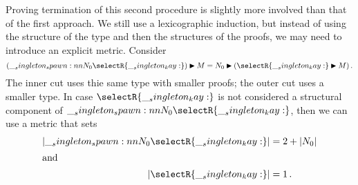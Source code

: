 Proving termination of this second procedure is slightly more involved than that of the first approach.
We still use a lexicographic induction, but instead of using the structure of the type and then the structures of the proofs, we may need to introduce an explicit metric.
Consider
\begin{equation*}
  \nspawn{(\spawn{N_0}{\selectR{\kay}})}{M}
    = \nspawn{N_0}{(\nspawn{\selectR{\kay}}{M})} \,.
\end{equation*}
The inner cut uses thie same type with smaller proofs; the outer cut uses a smaller type.
In case $\selectR{\kay}$ is not considered a structural component of $\spawn{N_0}{\selectR{\kay}}$, then we can use a metric that sets
\begin{align*}
  \lvert \spawn{N_0}{\selectR{\kay}} \rvert &= 2 + \lvert N_0 \rvert \\
\shortintertext{and}
  \lvert \selectR{\kay} \rvert &= 1 \,.
\end{align*}








